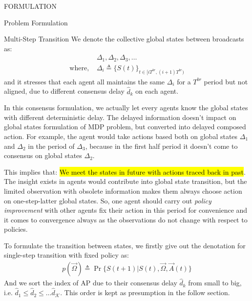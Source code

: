 \documentclass[10pt, conference, letterpaper]{IEEEtran}
\begin{document}
\begin{section}{FORMULATION}
\begin{subsection}{Problem Formulation}
\begin{subsubsection}{Multi-Step Transition}
                We denote the collective global states between broadcasts as:
                \begin{align}
                    & \Delta_1, \Delta_2, \Delta_3, \dots
                    \\
                    \text{where, } & \Delta_i \triangleq \{S(t)\}_{t \in [iT^{br},(i+1)T^{br})} \nonumber
                \end{align}
                and it stresses that each agent all maintains the same $\Delta_i$ for a $T^{br}$ period but not aligned, due to different consensus delay $\hat{d}_k$ on each agent.
                
                In this consensus formulation, we actually let every agents know the global states with different deterministic delay. The delayed information doesn't impact on global states formulation of MDP problem, but converted into delayed composed action. For example, the agent would take actions based both on global states $\Delta_1$ and $\Delta_2$ in the period of $\Delta_3$, because in the first half period it doesn't come to consensus on global states $\Delta_2$.

                This implies that: \hl{We meet the states in future with actions traced back in past}. The insight exists in agents would contribute into global state transition, but the limited observation with obsolete information makes them always choose action on one-step-latter global states. So, one agent should carry out \emph{policy improvement} with other agents fix their action in this period for convenience and it comes to convergence always as the observations do not change with respect to policies. 

                To formulate the transition between states, we firstly give out the denotation for single-step transition with fixed policy as:
                \begin{align}
                    p(\vec{\Omega}) \triangleq \Pr\{ S(t+1)|S(t), \vec{\Omega},\vec{A}(t) \}
                \end{align}
                And we sort the index of AP due to their consensus delay $\hat{d}_k$ from small to big, i.e. $\hat{d}_1 \leq \hat{d}_2 \leq \dots \hat{d}_{\mathcal{K}}$. This order is kept as presumption in the follow section.


\end{subsubsection}
\end{subsection}
\end{section}
\end{document}
